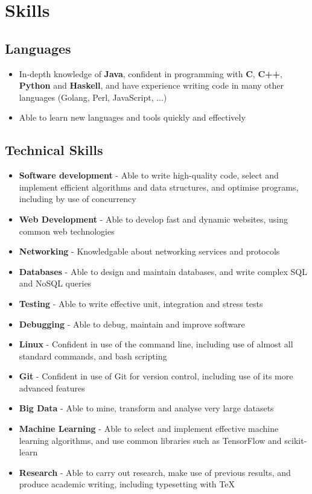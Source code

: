 \documentclass[a4paper, 8pt]{extarticle}
\begin{document}
\begin{minipage}[t]{.32\textwidth}
\section*{Skills}

\subsection*{Languages}
\begin{itemize}
\item In-depth knowledge of \textbf{Java}, confident in programming with \textbf{C}, \textbf{C++}, \textbf{Python} and \textbf{Haskell}, and have experience writing code in many other languages (Golang, Perl, JavaScript, ...)
\item Able to learn new languages and tools quickly and effectively
\end{itemize}

\subsection*{Technical Skills}
\begin{itemize}
\item \textbf{Software development} - Able to write high-quality code, select and implement efficient algorithms and data structures, and optimise programs, including by use of concurrency
\item \textbf{Web Development} - Able to develop fast and dynamic websites, using common web technologies
\item \textbf{Networking} - Knowledgable about networking services and protocols
\item \textbf{Databases} - Able to design and maintain databases, and write complex SQL and NoSQL queries
\item \textbf{Testing} - Able to write effective unit, integration and stress tests
\item \textbf{Debugging} - Able to debug, maintain and improve software
\item \textbf{Linux} - Confident in use of the command line, including use of almost all standard commands, and bash scripting
\item \textbf{Git} - Confident in use of Git for version control, including use of its more advanced features
\item \textbf{Big Data} - Able to mine, transform and analyse very large datasets
\item \textbf{Machine Learning} - Able to select and implement effective machine learning algorithms, and use common libraries such as TensorFlow and scikit-learn
\item \textbf{Research} - Able to carry out research, make use of previous results, and produce academic writing, including typesetting with \TeX
\end{itemize}



\end{minipage}
\end{document}
